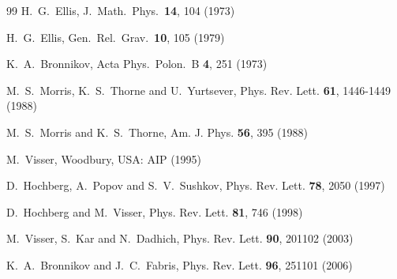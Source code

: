 \documentclass{article}
\begin{document}
\begin{small}
\begin{thebibliography}{99}
  H.~G.~Ellis,
  J.\ Math.\ Phys.\  {\bf 14}, 104 (1973)

  H.~G.~Ellis,
  Gen.\ Rel.\ Grav.\  {\bf 10}, 105 (1979)

  K.~A.~Bronnikov,
  Acta Phys.\ Polon.\ B {\bf 4}, 251 (1973)

M.~S.~Morris, K.~S.~Thorne and U.~Yurtsever,
Phys. Rev. Lett. \textbf{61}, 1446-1449 (1988)

M.~S.~Morris and K.~S.~Thorne,
Am. J. Phys. \textbf{56}, 395 (1988)

  M.~Visser,
  Woodbury, USA: AIP (1995)

D.~Hochberg, A.~Popov and S.~V.~Sushkov,
Phys. Rev. Lett. \textbf{78}, 2050 (1997)

D.~Hochberg and M.~Visser,
Phys. Rev. Lett. \textbf{81}, 746 (1998)

M.~Visser, S.~Kar and N.~Dadhich,
Phys. Rev. Lett. \textbf{90}, 201102 (2003)

K.~A.~Bronnikov and J.~C.~Fabris,
Phys. Rev. Lett. \textbf{96}, 251101 (2006)


\end{thebibliography}
\end{small}
\end{document}
